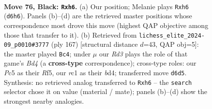 \documentclass[11pt]{article}
\begin{document}
\begin{figure}[p]\centering
\begin{subfigure}{0.46\textwidth}\centering
\resizebox{\linewidth}{!}{%
\newchessgame
\chessboard[
  setfen={8/3k4/p2r3B/Ppp2p1p/2p2P1P/4PbP1/1P3K2/2R5 b - - 0 76},
  showmover=false,
  pgfstyle=straightmove, color=movearrow, markmove={d6-h6}
]}
\caption{}
\end{subfigure}\hfill
\begin{subfigure}{0.46\textwidth}\centering
\resizebox{\linewidth}{!}{%
\newchessgame
\chessboard[
  setfen={8/5k2/5p2/1p1b1r1p/p2B3P/P1P2PK1/1P6/5R2 b - - 69 84},
  showmover=false,
  pgfstyle=straightmove, color=movearrow, markmove={d5-c4}
]}
\caption{}
\end{subfigure}
\\[4pt]

\caption{\textbf{Move 76, Black: \texttt{Rxh6}.} (a) Our position; Melanie plays \texttt{Rxh6} (\texttt{d6h6}). Panels (b)--(d) are the retrieved master positions whose correspondence most drove this move (highest QAP objective among those that transfer to it). (b) Retrieved from \texttt{lichess\_elite\_2024-09\_p0010\#3777} (ply 167) [structural distance $d$=43, QAP obj=5]: the master played \texttt{Bc4}; under $\mu$ our \emph{Rd3} plays the role of that game's \emph{Bd4} (a \textbf{cross-type} correspondence); cross-type roles: our \emph{P}c5 as their \emph{R}f5, our \emph{r}c1 as their \emph{b}d4; transferred move \texttt{d6d5}. Synthesis: no retrieved analog transferred to \texttt{Rxh6} -- the \texttt{search} selector chose it on value (material / mate); panels (b)--(d) show the strongest nearby analogies.}
\label{fig:thought-m151}
\end{figure}

\clearpage
\end{document}
